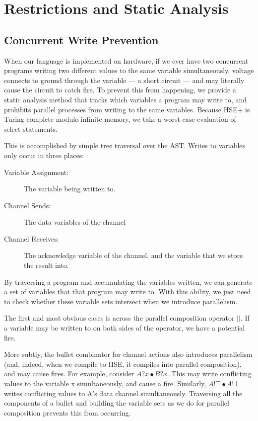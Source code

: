 \documentclass[times, 10pt]{article}
\begin{document}
\section{Restrictions and Static Analysis}

\subsection{Concurrent Write Prevention}

When our language is implemented on hardware, if we ever have two concurrent
programs writing two different values to the same variable simultaneously,
voltage connects to ground through the variable --- a short circuit --- and may
literally cause the circuit to catch fire.  To prevent this from happening, we
provide a static analysis method that tracks which variables a program may write
to, and prohibits parallel processes from writing to the same variables.
Because HSE+ is Turing-complete modulo infinite memory, we take a worst-case
evaluation of select statements.

This is accomplished by simple tree traversal over the AST.  Writes to variables
only occur in three places:

\begin{description}
\item[Variable Assignment:] The variable being written to.
\item[Channel Sends:] The data variables of the channel
\item[Channel Receives:] The acknowledge variable of the channel, and the
variable that we store the result into.
\end{description}

By traversing a program and accumulating the variables written, we can generate
a set of variables that that program may write to.  With this ability, we just
need to check whether these variable sets intersect when we introduce
parallelism.

The first and most obvious cases is across the parallel composition operator
$||$.  If a variable may be written to on both sides of the operator, we have a
potential fire.

More subtly, the bullet combinator for channel actions also introduces
parallelism (and, indeed, when we compile to HSE, it compiles into parallel
composition), and may cause fires.  For example, consider $A?x \bullet B?x$.
This may write conflicting values to the variable x simultaneously, and cause a
fire.  Similarly, $A!\top \bullet A!\bot$ writes conflicting values to A's data
channel simultaneously.  Traversing all the components of a bullet and building
the variable sets as we do for parallel composition prevents this from occurring.
\end{document}
